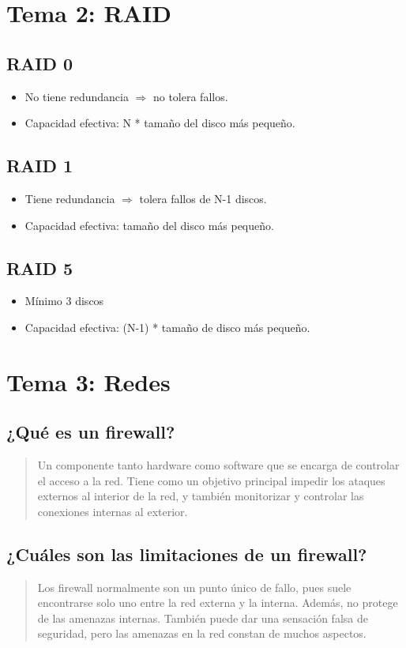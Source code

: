 \documentclass[11pt]{article}
\begin{document}
\section{Tema 2: RAID}
\label{sec:orgac390dc}
\subsection{RAID 0}
\label{sec:orgfdec8fd}
\begin{itemize}
\item No tiene redundancia \(\Rightarrow\) no tolera fallos.
\item Capacidad efectiva: N * tamaño del disco más pequeño.
\end{itemize}
\subsection{RAID 1}
\label{sec:orgb1bc280}
\begin{itemize}
\item Tiene redundancia \(\Rightarrow\) tolera fallos de N-1 discos.
\item Capacidad efectiva: tamaño del disco más pequeño.
\end{itemize}
\subsection{RAID 5}
\label{sec:org90411fb}
\begin{itemize}
\item Mínimo 3 discos
\item Capacidad efectiva: (N-1) * tamaño de disco más pequeño.
\end{itemize}
\section{Tema 3: Redes}
\label{sec:org61bf1dd}
\subsection{¿Qué es un firewall?}
\label{sec:org540d2b1}
\begin{quote}
Un componente tanto hardware como software que se encarga de controlar el acceso a la red. Tiene como un objetivo principal impedir los ataques externos al interior de la red, y también monitorizar y controlar las conexiones internas al exterior.
\end{quote}
\subsection{¿Cuáles son las limitaciones de un firewall?}
\label{sec:org8e5dea4}
\begin{quote}
Los firewall normalmente son un punto único de fallo, pues suele encontrarse solo uno entre la red externa y la interna. Además, no protege de las amenazas internas. También puede dar una sensación falsa de seguridad, pero las amenazas en la red constan de muchos aspectos.
\end{quote}
\end{document}
